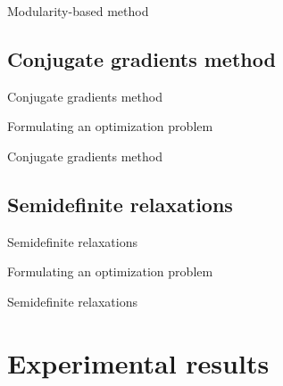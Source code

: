 \documentclass{beamer}
\theoremstyle{definition}
\theoremstyle{plain}
\theoremstyle{remark}
\begin{document}
			\begin{frame}{Modularity-based method}
				
			\end{frame}
	
		\subsection{Conjugate gradients method}
			\begin{frame}{Conjugate gradients method}
				\begin{block}{Formulating an optimization problem}
				\end{block}
			\end{frame}

			\begin{frame}{Conjugate gradients method}
				
			\end{frame}

		\subsection{Semidefinite relaxations}
			\begin{frame}{Semidefinite relaxations}
				\begin{block}{Formulating an optimization problem}
				\end{block}
			\end{frame}

			\begin{frame}{Semidefinite relaxations}
				
			\end{frame}

	\section{Experimental results}
		\begin{frame}{}
				
		\end{frame}
\end{document}
